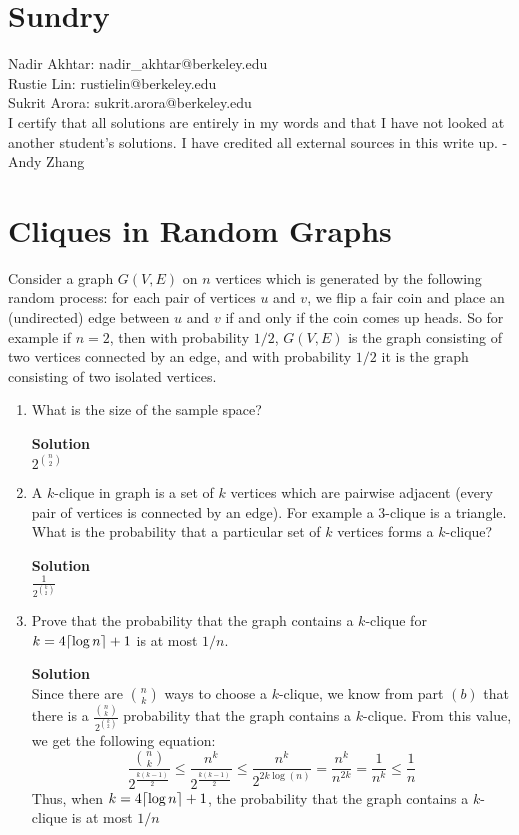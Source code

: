 \documentclass[11pt]{article}
\newcommand*{\Question}[1]{\section{#1}}
\newenvironment{Parts}{\begin{enumerate}[label=(\alph*)]}{\end{enumerate}}
\newcommand*{\Part}{\item}
\newenvironment{Answer}{\vspace{10pt}\begin{mdframed}\textbf{Solution}\\}{\end{mdframed}\vfill\pagebreak[3]}
\newenvironment{Answer}{\vspace{10pt}}{\vfill\pagebreak[3]}
\DeclarePairedDelimiter{\ceil}{\lceil}{\rceil}
\begin{document}
\Question{Sundry} 
\vspace{10pt}
\noindent Nadir Akhtar: nadir\_akhtar@berkeley.edu\\
Rustie Lin: rustielin@berkeley.edu\\
Sukrit Arora: sukrit.arora@berkeley.edu\\

I certify that all solutions are entirely in my words and that I have not looked at another student’s
solutions. I have credited all external sources in this write up. - Andy Zhang
\vfill\pagebreak[3]

\Question{Cliques in Random Graphs}

Consider a graph $G(V,E)$ on $n$ vertices which is generated by the following random process: for each pair of vertices $u$ and $v$, we flip a fair coin and place an (undirected) edge between $u$ and $v$ if and only if the coin comes up heads. So for example if $n = 2$, then with probability $1/2$, $G(V,E)$ is the graph consisting of two vertices connected by an edge, and with probability $1/2$ it is the graph consisting of two isolated vertices.

\begin{Parts}
	\Part What is the size of the sample space?
	\begin{Answer}
        $2^{\binom{n}{2}}$
	\end{Answer}

	\Part A $k$-clique in graph is a set of $k$ vertices which are pairwise adjacent (every pair of vertices is connected by an edge). For example a $3$-clique is a triangle. What is the probability that a particular
	set of $k$ vertices forms a $k$-clique? 
	\begin{Answer}
    $\frac{1}{2^\binom{k}{2}}$
	\end{Answer}
	\Part Prove that the probability that the graph contains a $k$-clique for $k = 4\ceil{\log n}+1$ is at most
	$1/n$. 
	\begin{Answer}
    Since there are $\binom{n}{k}$ ways to choose a $k$-clique, we know from part $(b)$ that there is a $\frac{\binom{n}{k}}{2^\binom{k}{2}}$ probability that the graph contains a $k$-clique. From this value, we get the following equation:$$\frac{\binom{n}{k}}{2^{\frac{k(k-1)}{2}}} \leq \frac{n^k}{2^{\frac{k(k-1)}{2}}} \leq \frac{n^k}{2^{2k\log(n)}}=\frac{n^k}{n^{2k}}=\frac{1}{n^k}\leq \frac{1}{n}$$ Thus, when $k = 4\ceil{\log n}+1$, the probability that the graph contains a $k$-clique is at most $1/n$
	\end{Answer}
\end{Parts}
\end{document}
